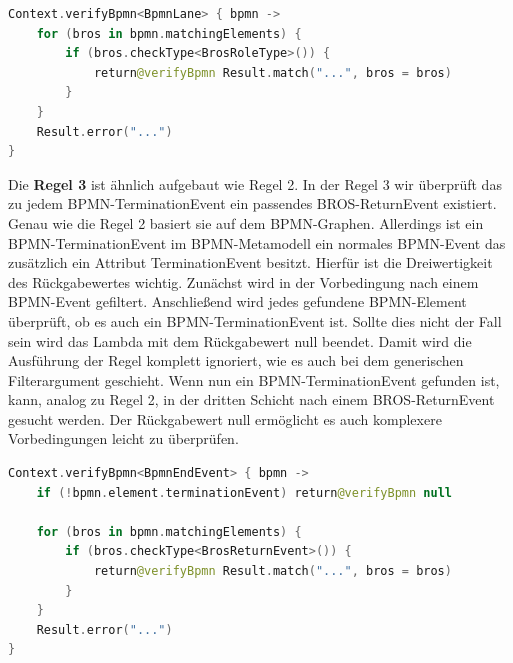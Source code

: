 \begin{lstlisting}[language=Kotlin, caption=Implementierung von Regel 2, label=lst:implementation_rule_2]
Context.verifyBpmn<BpmnLane> { bpmn ->
    for (bros in bpmn.matchingElements) {
        if (bros.checkType<BrosRoleType>()) {
            return@verifyBpmn Result.match("...", bros = bros)
        }
    }
    Result.error("...")
}
\end{lstlisting}

Die \textbf{Regel 3} ist ähnlich aufgebaut wie Regel 2.
In der Regel 3 wir überprüft das zu jedem BPMN-TerminationEvent ein passendes BROS-ReturnEvent existiert.
Genau wie die Regel 2 basiert sie auf dem BPMN-Graphen.
Allerdings ist ein BPMN-TerminationEvent im BPMN-Metamodell ein normales BPMN-Event das zusätzlich ein Attribut TerminationEvent besitzt.
Hierfür ist die Dreiwertigkeit des Rückgabewertes wichtig.
Zunächst wird in der Vorbedingung nach einem BPMN-Event gefiltert.
Anschließend wird jedes gefundene BPMN-Element überprüft, ob es auch ein BPMN-TerminationEvent ist.
Sollte dies nicht der Fall sein wird das Lambda mit dem Rückgabewert null beendet.
Damit wird die Ausführung der Regel komplett ignoriert, wie es auch bei dem generischen Filterargument geschieht.
Wenn nun ein BPMN-TerminationEvent gefunden ist, kann, analog zu Regel 2, in der dritten Schicht nach einem BROS-ReturnEvent gesucht werden.
Der Rückgabewert null ermöglicht es auch komplexere Vorbedingungen leicht zu überprüfen.

\begin{lstlisting}[language=Kotlin, caption=Implementierung von Regel 3, label=lst:implementation_rule_3]
Context.verifyBpmn<BpmnEndEvent> { bpmn ->
    if (!bpmn.element.terminationEvent) return@verifyBpmn null

    for (bros in bpmn.matchingElements) {
        if (bros.checkType<BrosReturnEvent>()) {
            return@verifyBpmn Result.match("...", bros = bros)
        }
    }
    Result.error("...")
}
\end{lstlisting}

